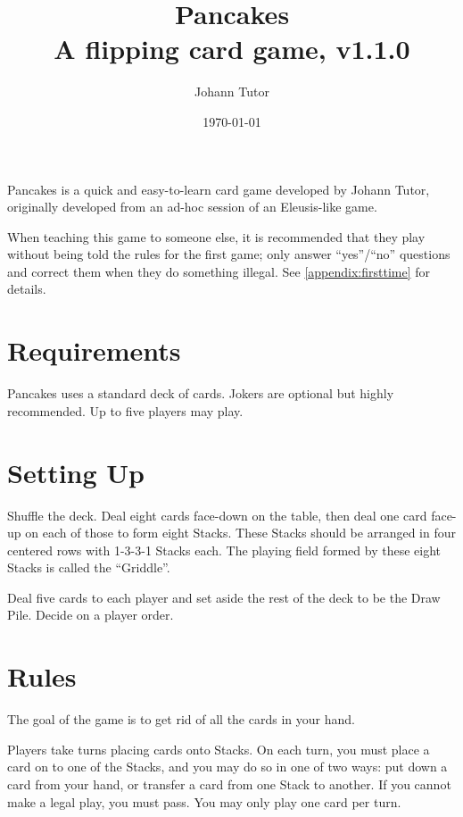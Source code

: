 \documentclass{article}
\newcommand\theversion{1.1.0}
\begin{document}
\title{Pancakes\\ \large A flipping card game, v\theversion}
\author{Johann Tutor}
\date{\today}
\maketitle

Pancakes is a quick and easy-to-learn card game developed by Johann Tutor, originally developed from an ad-hoc session of an Eleusis-like game.

When teaching this game to someone else, it is recommended that they play without being told the rules for the first game;
only answer ``yes''/``no'' questions and correct them when they do something illegal. See \autoref{appendix:firsttime} for details.

\tableofcontents

\newpage

\section{Requirements}
\label{sec:requirements}

Pancakes uses a standard deck of cards. Jokers are optional but highly recommended.
Up to five players may play.

\section{Setting Up}
\label{sec:setup}

Shuffle the deck. Deal eight cards face-down on the table, then deal one card face-up on each of those to form eight Stacks.
These Stacks should be arranged in four centered rows with 1-3-3-1 Stacks each.
The playing field formed by these eight Stacks is called the ``Griddle''.

Deal five cards to each player and set aside the rest of the deck to be the Draw Pile. Decide on a player order.

\section{Rules}
\label{sec:rules}

The goal of the game is to get rid of all the cards in your hand.

Players take turns placing cards onto Stacks. On each turn, you must place a card on to one of the Stacks, and you may do so in one of two ways: put down a card from your hand, or transfer a card from one Stack to another. If you cannot make a legal play, you must pass. You may only play one card per turn.
\end{document}
